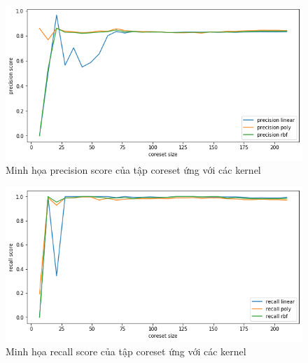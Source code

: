 \documentclass[a4paper, 12pt, oneside]{report}
\begin{document}
\begin{center}
    \begin{figure}[H]
    \begin{center}
     \includegraphics[scale=0.5]{precision_AR_gender.png}
    \end{center}
     \caption{Minh họa precision score của tập coreset ứng với các kernel}
    \label{Hình 5.14}
    \end{figure}
\end{center}
\begin{center}
    \begin{figure}[H]
    \begin{center}
     \includegraphics[scale=0.5]{recall_AR_gender.png}
    \end{center}
     \caption{Minh họa recall score của tập coreset ứng với các kernel}
    \label{Hình 5.15}
    \end{figure}
\end{center}
\end{document}
